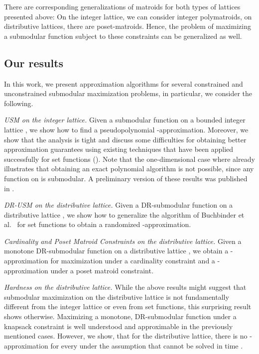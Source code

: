 \documentclass{article}
\theoremstyle{plain}
\theoremstyle{definition}
\begin{document}
There are corresponding generalizations of matroids for both types of lattices presented above: 
On the integer lattice, we can consider integer polymatroids, on distributive lattices, there are poset-matroids. 
Hence, the problem of maximizing a submodular function subject to these constraints can be generalized as well. 
 
\subsection{Our results}
In this work, we present approximation algorithms for several constrained and unconstrained submodular maximization problems, 
in particular, we consider the following. 

\emph{USM on the integer lattice.}
Given a submodular function  on a bounded integer lattice , 
we show how to find a pseudopolynomial -approximation. 
Moreover, we show that the analysis is tight and discuss some difficulties for obtaining 
better approximation guarantees using existing techniques that have been applied successfully for set functions (). 
Note that the one-dimensional case where  already illustrates that obtaining an exact polynomial algorithm 
is not possible, since any function on  is submodular.  
A preliminary version of these results was published in \cite{mySubmax}.  

\emph{DR-USM on the distributive lattice.}
Given a DR-submodular function  on a distributive lattice , we show how to generalize the algorithm of 
Buchbinder et al.\ \cite{DoubleGreedy} for set functions to obtain a randomized -approximation. 

\emph{Cardinality and Poset Matroid Constraints on the distributive lattice.}
Given a monotone DR-submodular function  on a distributive lattice , 
we obtain a -approximation 
for maximization under a cardinality constraint and a -approximation under a poset matroid constraint.
 


\emph{Hardness on the distributive lattice.}
While the above results might suggest that submodular maximization on the distributive lattice is not 
fundamentally different from the integer lattice or even from set functions, this surprising result shows otherwise. 
Maximizing a monotone, DR-submodular function under a knapsack constraint is well understood and approximable in the previously mentioned cases.  
However, we show, that for the distributive lattice, there is no -approximation for every  
under the assumption that  cannot be solved in time .
\end{document}
